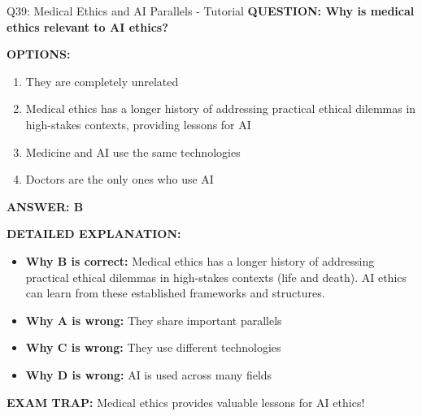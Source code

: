 \documentclass[8pt]{beamer}
\begin{document}
	\begin{frame}{Q39: Medical Ethics and AI Parallels - Tutorial}
		\fontsize{6.5}{7.5}\selectfont
		\textbf{QUESTION: Why is medical ethics relevant to AI ethics?}
		
		\vspace{0.1cm}
		\textbf{OPTIONS:}
		\begin{enumerate}
			\item They are completely unrelated
			\item Medical ethics has a longer history of addressing practical ethical dilemmas in high-stakes contexts, providing lessons for AI
			\item Medicine and AI use the same technologies
			\item Doctors are the only ones who use AI
		\end{enumerate}
		
		\vspace{0.1cm}
		\textcolor{myblue}{\textbf{ANSWER: B}}
		
		\vspace{0.1cm}
		\textbf{DETAILED EXPLANATION:}
		\begin{itemize}
			\item \textbf{Why B is correct:} Medical ethics has a longer history of addressing practical ethical dilemmas in high-stakes contexts (life and death). AI ethics can learn from these established frameworks and structures.
			\item \textbf{Why A is wrong:} They share important parallels
			\item \textbf{Why C is wrong:} They use different technologies
			\item \textbf{Why D is wrong:} AI is used across many fields
		\end{itemize}
		
		\textcolor{myred}{\textbf{EXAM TRAP:}} Medical ethics provides \textcolor{myblue}{valuable lessons} for AI ethics!
	\end{frame}
	
\end{document}
